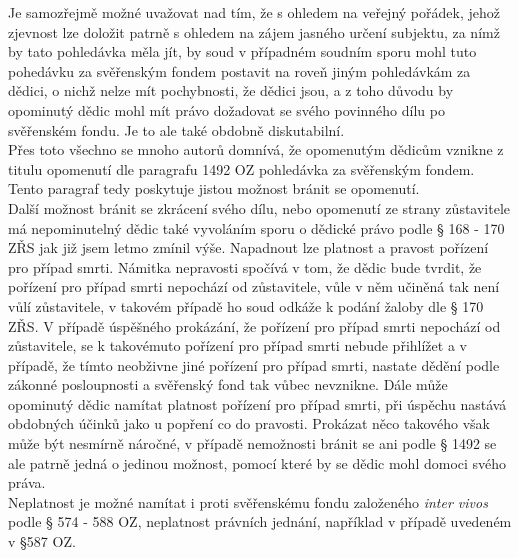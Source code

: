 \documentclass{article}
\begin{document}
  Je samozřejmě možné uvažovat nad tím, že s ohledem na veřejný pořádek, jehož zjevnost lze doložit patrně s ohledem na zájem jasného určení subjektu, za nímž by tato pohledávka měla jít, by soud v případném soudním sporu mohl tuto pohedávku za svěřenským fondem postavit na roveň jiným pohledávkám za dědici, o nichž nelze mít pochybnosti, že dědici jsou, a z toho důvodu by opominutý dědic mohl mít právo dožadovat se svého povinného dílu po svěřenském fondu. Je to ale také obdobně diskutabilní.\\
  
  Přes toto všechno se mnoho autorů domnívá, že opomenutým dědicům vznikne z titulu opomenutí dle paragrafu 1492 OZ pohledávka za svěřenským fondem. Tento paragraf tedy poskytuje jistou možnost bránit se opomenutí.\\
  
  Další možnost bránit se zkrácení svého dílu, nebo opomenutí ze strany zůstavitele má nepominutelný dědic také vyvoláním sporu o dědické právo podle § 168 - 170 ZŘS jak již jsem letmo zmínil výše. Napadnout lze platnost a pravost pořízení pro případ smrti. Námitka nepravosti spočívá v tom, že dědic bude tvrdit, že pořízení pro případ smrti nepochází od zůstavitele, vůle v něm učiněná tak není vůlí zůstavitele, v takovém případě ho soud odkáže k podání žaloby dle § 170 ZŘS. V případě úspěšného prokázání, že pořízení pro případ smrti nepochází od zůstavitele, se k takovémuto pořízení pro případ smrti nebude přihlížet a v případě, že tímto neobživne jiné pořízení pro případ smrti, nastate dědění podle zákonné posloupnosti a svěřenský fond tak vůbec nevznikne. Dále může opominutý dědic namítat platnost pořízení pro případ smrti, při úspěchu nastává obdobných účinků jako u popření co do pravosti. Prokázat něco takového však může být nesmírně náročné, v případě nemožnosti bránit se ani podle § 1492 se ale patrně jedná o jedinou možnost, pomocí které by se dědic mohl domoci svého práva.\\
  
  Neplatnost je možné namítat i proti svěřenskému fondu založeného \textit{inter vivos} podle § 574 - 588 OZ, neplatnost právních jednání, například v případě uvedeném v §587 OZ.\\

 
\end{document}
